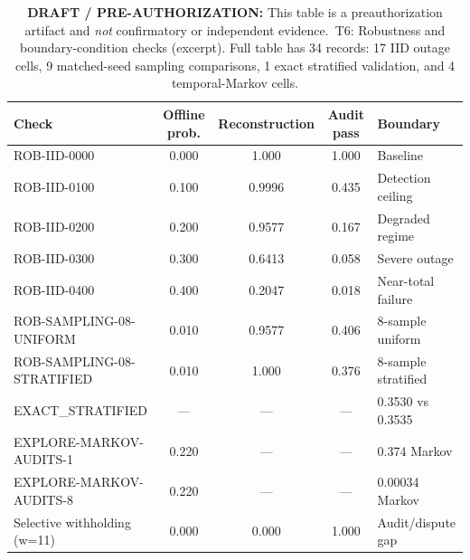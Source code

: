 \documentclass[10pt]{article}
\newcommand{\KeystoneDraftTableNotice}{\textbf{DRAFT / PRE-AUTHORIZATION:} This table is a preauthorization artifact and \textit{not} confirmatory or independent evidence.}
\begin{document}
\begin{table}[h]
\centering
\caption[\texorpdfstring{T6: Robustness and boundary conditions (excerpt)}{T6: Robustness and boundary conditions (excerpt)}]{\KeystoneDraftTableNotice\ \newline T6: Robustness and boundary-condition checks (excerpt). Full table has 34 records: 17 IID outage cells, 9 matched-seed sampling comparisons, 1 exact stratified validation, and 4 temporal-Markov cells.}
\label{tab:t6}
\small
\begin{tabular}{lcccl}
\toprule
Check & Offline prob. & Reconstruction & Audit pass & Boundary \\
\midrule
ROB-IID-0000 & 0.000 & 1.000 & 1.000 & Baseline \\
ROB-IID-0100 & 0.100 & 0.9996 & 0.435 & Detection ceiling \\
ROB-IID-0200 & 0.200 & 0.9577 & 0.167 & Degraded regime \\
ROB-IID-0300 & 0.300 & 0.6413 & 0.058 & Severe outage \\
ROB-IID-0400 & 0.400 & 0.2047 & 0.018 & Near-total failure \\
ROB-SAMPLING-08-UNIFORM & 0.010 & 0.9577 & 0.406 & 8-sample uniform \\
ROB-SAMPLING-08-STRATIFIED & 0.010 & 1.000 & 0.376 & 8-sample stratified \\
EXACT\_STRATIFIED & --- & --- & --- & 0.3530 vs 0.3535 \\
EXPLORE-MARKOV-AUDITS-1 & 0.220 & --- & --- & 0.374 Markov \\
EXPLORE-MARKOV-AUDITS-8 & 0.220 & --- & --- & 0.00034 Markov \\
Selective withholding (w=11) & 0.000 & 0.000 & 1.000 & Audit/dispute gap \\
\bottomrule
\end{tabular}
\end{table}
\end{document}
